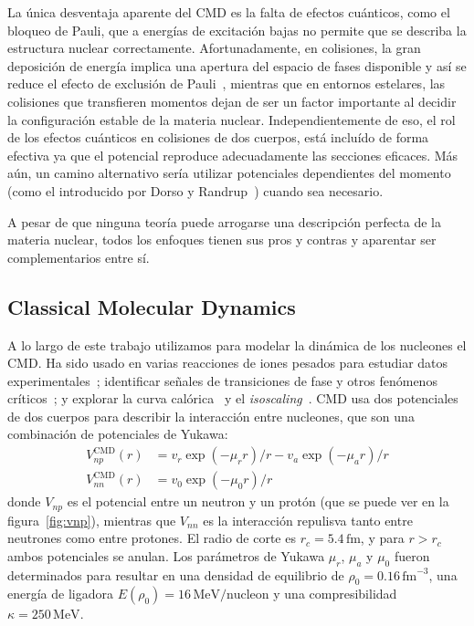 La única desventaja aparente del CMD es la falta de efectos cuánticos, como el bloqueo de Pauli, que a energías de excitación bajas no permite que se describa la estructura nuclear correctamente.
Afortunadamente, en colisiones, la gran deposición de energía implica una apertura del espacio de fases disponible y así se reduce el efecto de exclusión de Pauli~\cite{lopez_lectures_2000}, mientras que en entornos estelares, las colisiones que transfieren momentos dejan de ser un factor importante al decidir la configuración estable de la materia nuclear.
Independientemente de eso, el rol de los efectos cuánticos en colisiones de dos cuerpos, está incluído de forma efectiva ya que el potencial reproduce adecuadamente las secciones eficaces.
Más aún, un camino alternativo sería utilizar potenciales dependientes del momento (como el introducido por Dorso y Randrup~\cite{dorso_classical_1988}) cuando sea necesario.

A pesar de que ninguna teoría puede arrogarse una descripción perfecta de la materia nuclear, todos los enfoques tienen sus pros y contras y aparentar ser complementarios entre sí.

\subsection{Classical Molecular Dynamics}\label{ssc:cmd}
A lo largo de este trabajo utilizamos para modelar la dinámica de los nucleones el CMD.\@
Ha sido usado en varias reacciones de iones pesados para estudiar datos experimentales~\cite{chernomoretz_quasiclassical_2002}; identificar señales de transiciones de fase y otros fenómenos críticos~\cite{lopez_lectures_2000, barranon_searching_2001, dorso_selection_2001, barranon_critical_2003, barranon_time_2007}; y explorar la curva calórica~\cite{barranon_entropy_2004} y el \emph{isoscaling}~\cite{dorso_dynamical_2006, dorso_isoscaling_2011}.
CMD usa dos potenciales de dos cuerpos para describir la interacción entre nucleones, que son una combinación de potenciales de Yukawa:
\begin{align*}
  V^{\text{CMD}}_{np}(r) &=v_{r}\exp(-\mu_{r}r)/{r}-v_{a}\exp(-\mu_{a}r)/{r}\\
  V^{\text{CMD}}_{nn}(r) &=v_{0}\exp(-\mu_{0}r)/{r}
\end{align*}
donde $V_{np}$ es el potencial entre un neutron y un protón (que se puede ver en la figura~\ref{fig:vnp}), mientras que $V_{nn}$ es la interacción repulisva tanto entre neutrones como entre protones.
El radio de corte es $r_c=5.4\,\text{fm}$, y para $r>r_c$ ambos potenciales se anulan.
Los parámetros de Yukawa $\mu_r$, $\mu_a$ y $\mu_0$ fueron determinados para resultar en una densidad de equilibrio de $\rho_0=0.16\,\text{fm}^{-3}$, una energía de ligadora $E(\rho_0)=16\,\text{MeV/nucleon}$ y una compresibilidad $\kappa=250\,\text{MeV}$.

